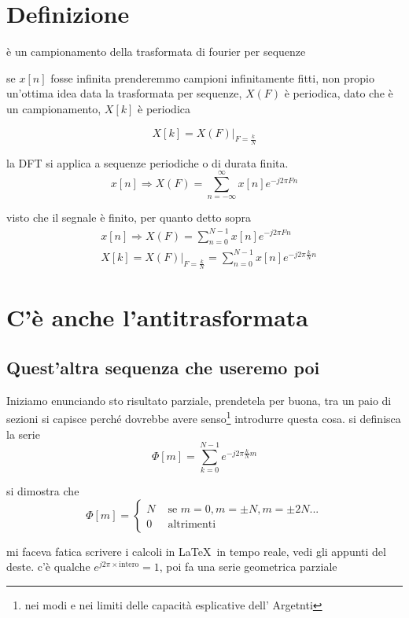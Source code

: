 \documentclass[11pt]{article}
\date{\today}
\title{}
\begin{document}
\tableofcontents

\section{Definizione}
\label{sec:org6b80e5d}
è un campionamento della trasformata di fourier per sequenze

se \(x[n]\) fosse infinita prenderemmo campioni infinitamente fitti, non
propio un'ottima idea
data la trasformata per sequenze, \(X(F)\) è periodica, dato che è un
campionamento, \(X[k]\) è periodica

\[
X[k] = X(F) \rvert _{F=\frac{k}{N}} \]

la DFT si applica a sequenze periodiche o di durata finita.
\[
x[n] \Rightarrow X(F) = \sum_{n = -\infty}^{\infty}
x[n] e^{-j2\pi Fn} \]

visto che il segnale è finito, per quanto detto sopra
\begin{align*}
&x[n] \Rightarrow X(F) = \sum_{n = 0}^{N-1} x[n] e^{-j2\pi Fn} \\
&X[k] = X(F) \rvert _{F=\frac{k}{N}}
= \sum_{n = 0}^{N-1} x[n] e^{-j2\pi \frac{k}{N}n}
\end{align*}

\section{C'è anche l'antitrasformata}
\label{sec:org238b8f1}

\subsection{Quest'altra sequenza che useremo poi}
\label{sec:org6ff8113}

Iniziamo enunciando sto risultato parziale, prendetela per buona, tra
un paio di sezioni si capisce perché dovrebbe avere senso\footnote{nei
modi e nei limiti delle capacità esplicative dell' Argetnti}
introdurre questa cosa.
si definisca la serie
\[
\Phi [m] = \sum_{k = 0}^{N-1} e^{-j2\pi \frac{k}{N}m}
\]

si dimostra che
\[
\Phi[m] = \begin{cases}
N & \text{ se } m = 0, m = \pm N, m = \pm 2N... \\
0 & \text{ altrimenti }
\end{cases}
\]

mi faceva fatica scrivere i calcoli in \LaTeX\ in tempo reale, vedi gli
appunti del deste.
c'è qualche \(e^{j2\pi \times \text{intero}} = 1\), poi fa una serie
geometrica parziale
\end{document}
